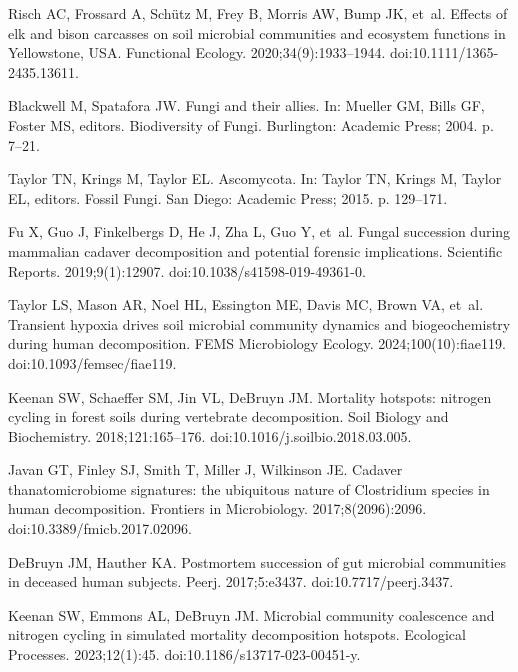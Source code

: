 \documentclass[
  10pt,
  letterpaper,
]{article}
\begin{document}
\begin{thebibliography}{10}
  Risch AC, Frossard A, Schütz M, Frey B, Morris AW, Bump JK, et~al.
  \newblock Effects of elk and bison carcasses on soil microbial communities and
    ecosystem functions in {Yellowstone}, {USA}.
  \newblock Functional Ecology. 2020;34(9):1933--1944.
  \newblock doi:{10.1111/1365-2435.13611}.
  
  Blackwell M, Spatafora JW.
  \newblock Fungi and their allies.
  \newblock In: Mueller GM, Bills GF, Foster MS, editors. Biodiversity of
    {Fungi}. Burlington: Academic Press; 2004. p. 7--21.
  
  Taylor TN, Krings M, Taylor EL.
  \newblock Ascomycota.
  \newblock In: Taylor TN, Krings M, Taylor EL, editors. Fossil {Fungi}. San
    Diego: Academic Press; 2015. p. 129--171.
  
  Fu X, Guo J, Finkelbergs D, He J, Zha L, Guo Y, et~al.
  \newblock Fungal succession during mammalian cadaver decomposition and
    potential forensic implications.
  \newblock Scientific Reports. 2019;9(1):12907.
  \newblock doi:{10.1038/s41598-019-49361-0}.
  
  Taylor LS, Mason AR, Noel HL, Essington ME, Davis MC, Brown VA, et~al.
  \newblock Transient hypoxia drives soil microbial community dynamics and
    biogeochemistry during human decomposition.
  \newblock FEMS Microbiology Ecology. 2024;100(10):fiae119.
  \newblock doi:{10.1093/femsec/fiae119}.
  
  Keenan SW, Schaeffer SM, Jin VL, DeBruyn JM.
  \newblock Mortality hotspots: nitrogen cycling in forest soils during
    vertebrate decomposition.
  \newblock Soil Biology and Biochemistry. 2018;121:165--176.
  \newblock doi:{10.1016/j.soilbio.2018.03.005}.
  
  Javan GT, Finley SJ, Smith T, Miller J, Wilkinson JE.
  \newblock Cadaver thanatomicrobiome signatures: the ubiquitous nature of
    {Clostridium} species in human decomposition.
  \newblock Frontiers in Microbiology. 2017;8(2096):2096.
  \newblock doi:{10.3389/fmicb.2017.02096}.
  
  DeBruyn JM, Hauther KA.
  \newblock Postmortem succession of gut microbial communities in deceased human
    subjects.
  \newblock Peerj. 2017;5:e3437.
  \newblock doi:{10.7717/peerj.3437}.
  
  Keenan SW, Emmons AL, DeBruyn JM.
  \newblock Microbial community coalescence and nitrogen cycling in simulated
    mortality decomposition hotspots.
  \newblock Ecological Processes. 2023;12(1):45.
  \newblock doi:{10.1186/s13717-023-00451-y}.
  

\end{thebibliography}
\end{document}
